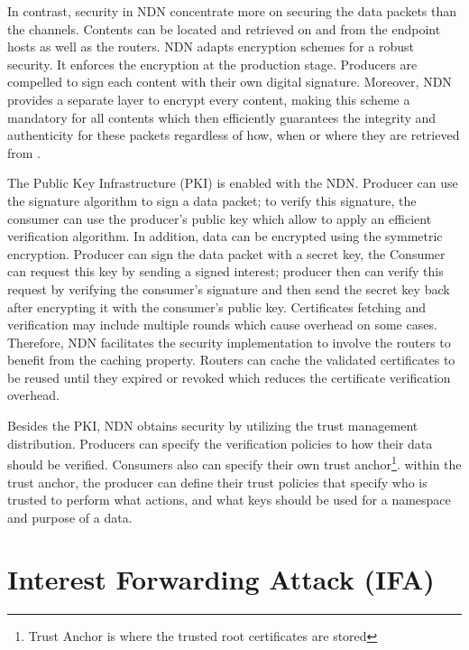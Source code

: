 \documentclass[conference]{IEEEtran}
\begin{document}
In contrast, security in NDN concentrate more on securing the data packets than the channels. Contents can be located and retrieved on and from the endpoint hosts as well as the routers. NDN adapts encryption schemes for a robust security. It enforces the encryption at the production stage. Producers are compelled to sign each content with their own digital signature. Moreover, NDN provides a separate layer to encrypt every content, making this scheme a mandatory for all contents which then efficiently guarantees the integrity and authenticity for these packets regardless of how, when or where they are retrieved from \cite{Gasti2013}. 

The Public Key Infrastructure (PKI) is enabled with the NDN. Producer can use the signature algorithm to sign a data packet; to verify this signature, the consumer can use the producer's public key which allow to apply an efficient verification algorithm. In addition, data can be encrypted using the symmetric encryption. Producer can sign the data packet with a secret key, the Consumer can request this key by sending a signed interest; producer then can verify this request by verifying the consumer's signature and then send the secret key back after encrypting it with the consumer's public key. Certificates fetching and verification may include multiple rounds which cause overhead on some cases. Therefore, NDN facilitates the security implementation to involve the routers to benefit from the caching property. Routers can cache the validated certificates to be reused until they expired or revoked which reduces the certificate verification overhead.  \cite{Zhang2018} 

Besides the PKI, NDN obtains security by utilizing the trust management distribution. Producers can specify the verification policies to how their data should be verified. Consumers also can specify their own trust anchor\footnote{Trust Anchor is where the trusted root certificates are stored}. within the trust anchor, the producer can define their trust policies that specify who is trusted to perform what actions, and what keys should be used for a namespace and purpose of a data.  


\section{Interest Forwarding Attack (IFA)}
\end{document}

